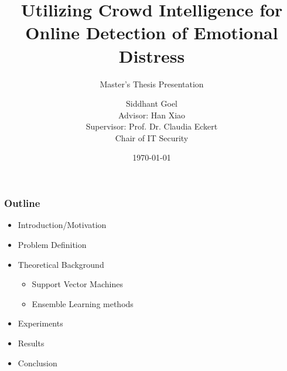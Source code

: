 \documentclass{beamer}
\title{Utilizing Crowd Intelligence for Online Detection of Emotional Distress}
\subtitle{Master's Thesis Presentation}
\author{
Siddhant Goel\\
\vspace{5mm}
Advisor: Han Xiao\\
Supervisor: Prof. Dr. Claudia Eckert\\
Chair of IT Security
}
\institute{Technische Universit\"at M\"unchen}
\date{\today}
\begin{document}
    \begin{frame}[plain]
        \titlepage
    \end{frame}
    
    \begin{frame}
        \frametitle{Outline}
        \begin{itemize}
            \item{Introduction/Motivation}
            \item{Problem Definition}
            \item{
            Theoretical Background
            \begin{itemize}
                \item{Support Vector Machines}
                \item{Ensemble Learning methods}
            \end{itemize}
            }
            \item{Experiments}
            \item{Results}
            \item{Conclusion}
        \end{itemize}
    \end{frame}
\end{document}
